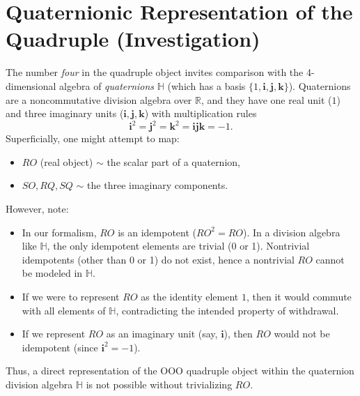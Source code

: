 \documentclass[12pt]{article}
\begin{document}
\section{Quaternionic Representation of the Quadruple (Investigation)}

The number \emph{four} in the quadruple object invites comparison with the 4-dimensional algebra of \emph{quaternions} $\mathbb{H}$ (which has a basis $\{1, \mathbf{i}, \mathbf{j}, \mathbf{k}\}$). Quaternions are a noncommutative division algebra over $\mathbb{R}$, and they have one real unit ($1$) and three imaginary units ($\mathbf{i},\mathbf{j},\mathbf{k}$) with multiplication rules 
\[
\mathbf{i}^2=\mathbf{j}^2=\mathbf{k}^2=\mathbf{i}\mathbf{j}\mathbf{k}=-1.
\]
Superficially, one might attempt to map:
\begin{itemize}
    \item $RO$ (real object) $\sim$ the scalar part of a quaternion,
    \item $SO, RQ, SQ$ $\sim$ the three imaginary components.
\end{itemize}

However, note:
\begin{itemize}
    \item In our formalism, $RO$ is an idempotent ($RO^2 = RO$). In a division algebra like $\mathbb{H}$, the only idempotent elements are trivial (0 or 1). Nontrivial idempotents (other than 0 or 1) do not exist, hence a nontrivial $RO$ cannot be modeled in $\mathbb{H}$.
    \item If we were to represent $RO$ as the identity element $1$, then it would commute with all elements of $\mathbb{H}$, contradicting the intended property of withdrawal.
    \item If we represent $RO$ as an imaginary unit (say, $\mathbf{i}$), then $RO$ would not be idempotent (since $\mathbf{i}^2=-1$).
\end{itemize}

Thus, a direct representation of the OOO quadruple object within the quaternion division algebra $\mathbb{H}$ is not possible without trivializing $RO$.

\medskip
\end{document}
